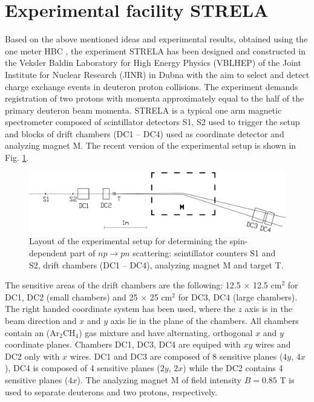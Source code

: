 \documentclass[twocolumn,epjc3]{svjour3}
\newcommand{\np}     {\ensuremath{np \rightarrow pn}\xspace}
\begin{document}
\section{Experimental facility STRELA}
Based on the above mentioned ideas and experimental results, obtained using the
one meter HBC \cite{gla02,gla08}, the experiment STRELA has been designed and
constructed in the Veksler Baldin Laboratory for High Energy Physics (VBLHEP) of
the Joint Institute for Nuclear Research (JINR) in Dubna with the aim to select
and detect charge exchange events in deuteron proton collisions. The experiment
demands registration of two protons with momenta approximately equal to the half
of the primary deuteron beam momenta. STRELA is a typical one arm magnetic
spectrometer composed of scintillator detectors S1, S2 used to trigger the setup
and blocks of drift chambers (DC1 -- DC4) used as coordinate detector and
analyzing magnet M. The recent version of the experimental setup is shown in
Fig. \ref{fig:STRELA_layout}.

\begin{figure}[t] %
  \centering
  \includegraphics[width=1.00\textwidth]{STRELA_layout.pdf}
  \caption{Layout of the experimental setup for determining the spin-dependent
    part of \np scattering: scintillator counters S1 and S2, drift chambers (DC1
    -- DC4), analyzing magnet M and target T.}
  \label{fig:STRELA_layout}
\end{figure}

The sensitive areas of the drift chambers are the following: 12.5 $\times$ 12.5
cm$^2$ for DC1, DC2 (small chambers) and 25 $\times$ 25 cm$^2$ for DC3, DC4
(large chambers). The right handed coordinate system has been used, where the
$z$ axis is in the beam direction and $x$ and $y$ axis lie in the plane of the
chambers. All chambers contain an (Ar$_2$CH$_4$) gas mixture and have
alternating, orthogonal $x$ and $y$ coordinate planes. Chambers DC1, DC3, DC4
are equiped with $xy$ wires and DC2 only with $x$ wires. DC1 and DC3 are
composed of 8 sensitive planes ($4y$, $4x$), DC4 is composed of 4 sensitive
planes ($2y$, $2x$) while the DC2 contains 4 sensitive planes ($4x$). The
analyzing magnet M of field intensity $B = 0.85$ T is used to separate deuterons
and two protons, respectively.
\end{document}
